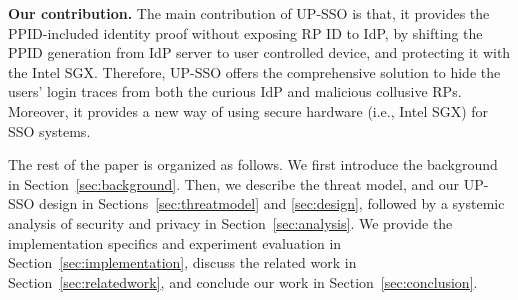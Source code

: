

\begin{comment}
We summarize our contributions as follows.
\begin{itemize}
\item We propose the comprehensive solution to hide the users' login traces from both the curious IdP and malicious collusive RPs for convenient SSO system.
\item We formally analyze the security of XXX and show that it guarantees the security, while the users' login traces are well protected.
\item We have implemented a prototype of XXX, and compare the performance of the UP-SSO prototype with the state-of-the-art SSO systems (e.g., OIDC), and demonstrate its efficiency.
\end{itemize}
\end{comment}

\vspace{1mm}\noindent\textbf{Our contribution. }The main contribution of UP-SSO is that, it provides the PPID-included identity proof without exposing RP ID to IdP, by shifting the PPID generation from IdP server to user controlled device, and protecting it with the Intel SGX.
Therefore, UP-SSO offers the comprehensive solution to hide the users' login traces from both the curious IdP and malicious collusive RPs. 
Moreover, it provides a new way of using secure hardware (i.e., Intel SGX) for SSO systems.

The rest of the paper is organized as follows. We first introduce the background in Section~\ref{sec:background}. Then, we describe the threat model, and our UP-SSO design in Sections~\ref{sec:threatmodel} and \ref{sec:design}, followed by a systemic analysis of security and privacy in Section~\ref{sec:analysis}. We provide the implementation specifics and experiment evaluation in Section~\ref{sec:implementation},  discuss the related work in Section~\ref{sec:relatedwork}, and conclude our work in Section~\ref{sec:conclusion}.
